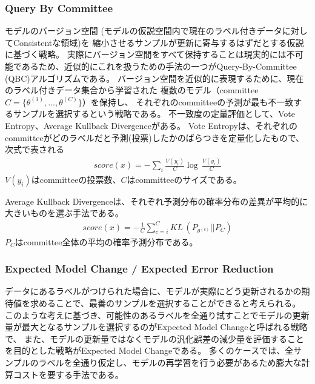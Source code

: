 \subsubsection{Query By Committee}
モデルのバージョン空間 (モデルの仮説空間内で現在のラベル付きデータに対してConsistentな領域)を
縮小させるサンプルが更新に寄与するはずだとする仮説に基づく戦略。
実際にバージョン空間をすべて保持することは現実的には不可能であるため、近似的にこれを扱うための手法の一つがQuery-By-Committee (QBC)\cite{seung1992query}アルゴリズムである。
バージョン空間を近似的に表現するために、現在のラベル付きデータ集合から学習された
複数のモデル（committee $C=\{ \theta^{(1)}, \dots, \theta^{(C)}\}$）を保持し、
それぞれのcommitteeの予測が最も不一致するサンプルを選択するという戦略である。
不一致度の定量評価として、Vote Entropy、Average Kullback Divergenceがある。
Vote Entropyは、それぞれのcommitteeがどのラベルだと予測(投票)したかのばらつきを定量化したもので、次式で表される
\begin{eqnarray}
    score(x) =  - \sum_i \frac{V(y_i)}{C} \log \, \frac{V(y_i)}{C}
\end{eqnarray}
$V(y_i)$はcommitteeの投票数、$C$はcommitteeのサイズである。

Average Kullback Divergenceは、それぞれ予測分布の確率分布の差異が平均的に大きいものを選ぶ手法である。
\begin{eqnarray}
    score(x) =  -  \frac{1}{C} \sum_{c=i}^C KL \, (P_{\theta^{(c)}} || P_C)
\end{eqnarray}
$P_C$はcommittee全体の平均の確率予測分布である。

\subsubsection{Expected Model Change / Expected Error Reduction}
データにあるラベルがつけられた場合に、モデルが実際にどう更新されるかの期待値を求めることで、最善のサンプルを選択することができると考えられる。
このような考えに基づき、可能性のあるラベルを全通り試すことでモデルの更新量が最大となるサンプルを選択するのがExpected Model Changeと呼ばれる戦略で、
また、モデルの更新量ではなくモデルの汎化誤差の減少量を評価することを目的とした戦略がExpected Model Changeである。
多くのケースでは、全サンプルのラベルを全通り仮定し、モデルの再学習を行う必要があるため膨大な計算コストを要する手法である。

